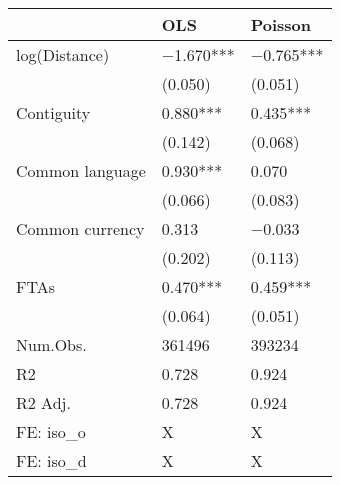 \begin{tabular}{lll}
\hline
& OLS & Poisson \\ \hline
log(Distance) & \num{-1.670}*** & \num{-0.765}*** \\
& (\num{0.050}) & (\num{0.051}) \\
Contiguity & \num{0.880}*** & \num{0.435}*** \\
& (\num{0.142}) & (\num{0.068}) \\
Common language & \num{0.930}*** & \num{0.070} \\
& (\num{0.066}) & (\num{0.083}) \\
Common currency & \num{0.313} & \num{-0.033} \\
& (\num{0.202}) & (\num{0.113}) \\
FTAs & \num{0.470}*** & \num{0.459}*** \\
& (\num{0.064}) & (\num{0.051}) \\
Num.Obs. & \num{361496} & \num{393234} \\
R2 & \num{0.728} & \num{0.924} \\
R2 Adj. & \num{0.728} & \num{0.924} \\
FE: iso\_o & X & X \\
FE: iso\_d & X & X \\
\hline
\end{tabular}
